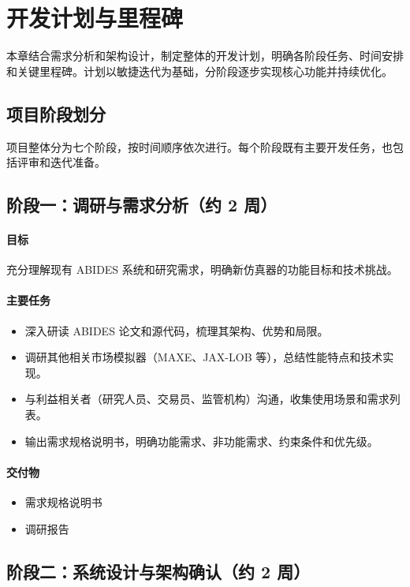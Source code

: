 \section{开发计划与里程碑}

本章结合需求分析和架构设计，制定整体的开发计划，明确各阶段任务、时间安排和关键里程碑。计划以敏捷迭代为基础，分阶段逐步实现核心功能并持续优化。

\subsection{项目阶段划分}

项目整体分为七个阶段，按时间顺序依次进行。每个阶段既有主要开发任务，也包括评审和迭代准备。

\subsection{阶段一：调研与需求分析（约 2 周）}

\paragraph{目标} 充分理解现有 ABIDES 系统和研究需求，明确新仿真器的功能目标和技术挑战。

\paragraph{主要任务}
\begin{itemize}
  \item 深入研读 ABIDES 论文和源代码，梳理其架构、优势和局限。
  \item 调研其他相关市场模拟器（MAXE、JAX-LOB 等），总结性能特点和技术实现。
  \item 与利益相关者（研究人员、交易员、监管机构）沟通，收集使用场景和需求列表。
  \item 输出需求规格说明书，明确功能需求、非功能需求、约束条件和优先级。
\end{itemize}

\paragraph{交付物}
\begin{itemize}
  \item 需求规格说明书
  \item 调研报告
\end{itemize}

\subsection{阶段二：系统设计与架构确认（约 2 周）}

